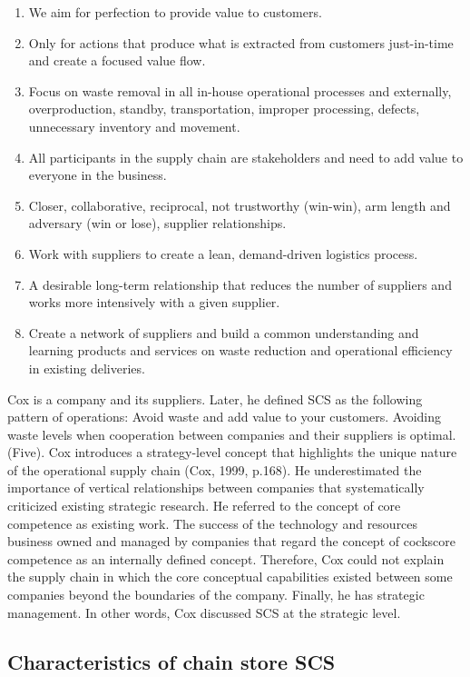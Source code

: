 \documentclass[]{article}
\begin{document}
\begin{enumerate}
\def\labelenumi{(\arabic{enumi})}
\item
  We aim for perfection to provide value to customers.
\item
  Only for actions that produce what is extracted from customers
  just-in-time and create a focused value flow.
\item
  Focus on waste removal in all in-house operational processes and
  externally, overproduction, standby, transportation, improper
  processing, defects, unnecessary inventory and movement.
\item
  All participants in the supply chain are stakeholders and need to add
  value to everyone in the business.
\item
  Closer, collaborative, reciprocal, not trustworthy (win-win), arm
  length and adversary (win or lose), supplier relationships.
\item
  Work with suppliers to create a lean, demand-driven logistics process.
\item
  A desirable long-term relationship that reduces the number of
  suppliers and works more intensively with a given supplier.
\item
  Create a network of suppliers and build a common understanding and
  learning products and services on waste reduction and operational
  efficiency in existing deliveries.
\end{enumerate}

Cox is a company and its suppliers. Later, he defined SCS as the
following pattern of operations: Avoid waste and add value to your
customers. Avoiding waste levels when cooperation between companies and
their suppliers is optimal. (Five). Cox introduces a strategy-level
concept that highlights the unique nature of the operational supply
chain (Cox, 1999, p.168). He underestimated the importance of vertical
relationships between companies that systematically criticized existing
strategic research. He referred to the concept of core competence as
existing work. The success of the technology and resources business
owned and managed by companies that regard the concept of cockscore
competence as an internally defined concept. Therefore, Cox could not
explain the supply chain in which the core conceptual capabilities
existed between some companies beyond the boundaries of the company.
Finally, he has strategic management. In other words, Cox discussed SCS
at the strategic level.

\hypertarget{characteristics-of-chain-store-scs}{%
\subsection{Characteristics of chain store
SCS}\label{characteristics-of-chain-store-scs}}
\end{document}
